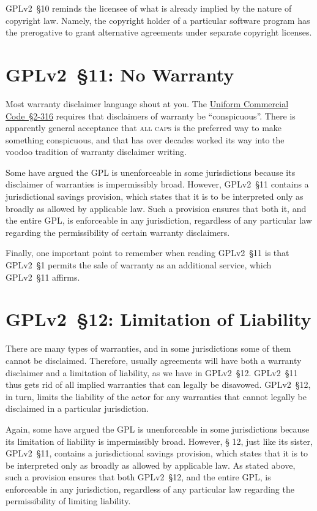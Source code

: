 GPLv2~\S10 reminds the licensee of what is already implied by the nature of
copyright law.  Namely, the copyright holder of a particular software
program has the prerogative to grant alternative agreements under separate
copyright licenses.

\section{GPLv2~\S11: No Warranty}
\label{GPLv2s11}

Most warranty disclaimer language shout at you.  The
\href{http://www.law.cornell.edu/ucc/2/2-316}{Uniform Commercial
  Code~\S2-316} requires that disclaimers of warranty be ``conspicuous''.
There is apparently general acceptance that \textsc{all caps} is the
preferred way to make something conspicuous, and that has over decades worked
its way into the voodoo tradition of warranty disclaimer writing.

Some have argued the GPL is unenforceable in some jurisdictions because
its disclaimer of warranties is impermissibly broad.  However, GPLv2~\S11
contains a jurisdictional savings provision, which states that it is to be
interpreted only as broadly as allowed by applicable law.  Such a
provision ensures that both it, and the entire GPL, is enforceable in any
jurisdiction, regardless of any particular law regarding the
permissibility of certain warranty disclaimers.

Finally, one important point to remember when reading GPLv2~\S11 is that GPLv2~\S1
permits the sale of warranty as an additional service, which GPLv2~\S11 affirms.

\section{GPLv2~\S12: Limitation of Liability}
\label{GPLv2s12}

There are many types of warranties, and in some jurisdictions some of them
cannot be disclaimed.  Therefore, usually agreements will have both a
warranty disclaimer and a limitation of liability, as we have in GPLv2~\S12.
GPLv2~\S11 thus gets rid of all implied warranties that can legally be
disavowed. GPLv2~\S12, in turn, limits the liability of the actor for any
warranties that cannot legally be disclaimed in a particular jurisdiction.

Again, some have argued the GPL is unenforceable in some jurisdictions
because its limitation of liability is impermissibly broad. However, \S
12, just like its sister, GPLv2~\S11, contains a jurisdictional savings
provision, which states that it is to be interpreted only as broadly as
allowed by applicable law.  As stated above, such a provision ensures that
both GPLv2~\S12, and the entire GPL, is enforceable in any jurisdiction,
regardless of any particular law regarding the permissibility of limiting
liability.

